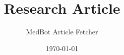\documentclass[11pt,a4paper]{article}
\begin{document}
\title{Research Article}
\author{MedBot Article Fetcher}
\date{\today}
\maketitle

\tableofcontents
\newpage
\end{document}
